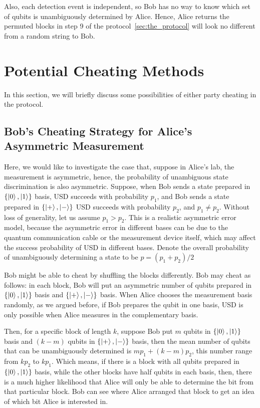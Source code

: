 \documentclass[%
 reprint,
superscriptaddress,
 amsmath,amssymb,
 aps,
]{revtex4-2}
\begin{document}
Also, each detection event is independent, so Bob has no way to know which set of qubits is unambiguously determined by Alice. Hence, Alice returns the permuted blocks in step 9 of the protocol~\ref{sec:the_protocol} will look no different from a random string to Bob.

\section{Potential Cheating Methods}
\label{sec:potential_cheating}

In this section, we will briefly discuss some possibilities of either party cheating in the protocol.

\subsection{Bob's Cheating Strategy for Alice's Asymmetric Measurement}
\label{sec:Bob_cheating_asymmetric_measurement}

Here, we would like to investigate the case that, suppose in Alice's lab, the measurement is asymmetric, hence, the probability of unambiguous state discrimination is also asymmetric. Suppose, when Bob sends a state prepared in $\{\ket{0}, \ket{1}\}$ basis, USD succeeds with probability $p_1$, and Bob sends a state prepared in $\{\ket{+}, \ket{-}\}$ USD succeeds with probability $p_2$, and $p_1\ne p_2$. Without loss of generality, let us assume $p_1> p_2$. This is a realistic asymmetric error model, because the asymmetric error in different bases can be due to the quantum communication cable or the measurement device itself, which may affect the success probability of USD in different bases. Denote the overall probability of unambiguously determining a state to be $p=(p_1+p_2)/2$

Bob might be able to cheat by shuffling the blocks differently. Bob may cheat as follows: in each block, Bob will put an asymmetric number of qubits prepared in $\{\ket{0}, \ket{1}\}$ basis and $\{\ket{+}, \ket{-}\}$ basis. When Alice chooses the measurement basis randomly, as we argued before, if Bob prepares the qubit in one basis, USD is only possible when Alice measures in the complementary basis.

Then, for a specific block of length $k$, suppose Bob put $m$ qubits in $\{\ket{0}, \ket{1}\}$ basis and $(k-m)$ qubits in $\{\ket{+}, \ket{-}\}$ basis, then the mean number of qubits that can be unambiguously determined is $mp_1+(k-m)p_2$, this number range from $kp_2$ to $kp_1$. Which means, if there is a block with all qubits prepared in $\{\ket{0}, \ket{1}\}$ basis, while the other blocks have half qubits in each basis, then, there is a much higher likelihood that Alice will only be able to determine the bit from that particular block. Bob can see where Alice arranged that block to get an idea of which bit Alice is interested in.
\end{document}
